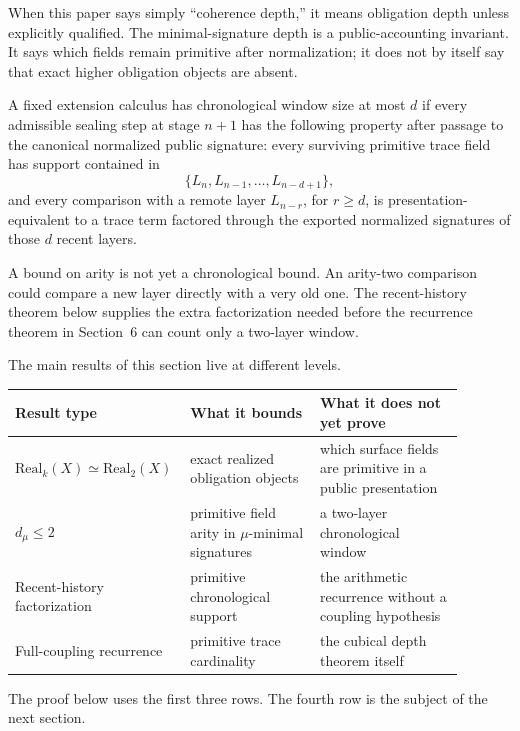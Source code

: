 When this paper says simply ``coherence depth,'' it means obligation depth unless explicitly
qualified.  The minimal-signature depth is a public-accounting invariant.  It says which
fields remain primitive after normalization; it does not by itself say that exact higher
obligation objects are absent.

\begin{definition}
\label{def:chronological-window}
A fixed extension calculus has chronological window size at most \(d\) if every admissible
sealing step at stage \(n+1\) has the following property after passage to the canonical
normalized public signature: every surviving primitive trace field has support contained in
\[
  \{L_n,L_{n-1},\ldots,L_{n-d+1}\},
\]
and every comparison with a remote layer \(L_{n-r}\), for \(r\geq d\), is
presentation-equivalent to a trace term factored through the exported normalized signatures of
those \(d\) recent layers.
\end{definition}

A bound on arity is not yet a chronological bound.  An arity-two comparison could compare a
new layer directly with a very old one.  The recent-history theorem below supplies the extra
factorization needed before the recurrence theorem in Section~6 can count only a two-layer
window.

\begin{remark}
\label{rem:level-audit}
The main results of this section live at different levels.
\begin{center}
\small
\begin{tabular}{p{0.29\linewidth}p{0.29\linewidth}p{0.31\linewidth}}
\hline
Result type & What it bounds & What it does not yet prove \\
\hline
\(\mathrm{Real}_k(X)\simeq \mathrm{Real}_2(X)\) & exact realized obligation objects &
which surface fields are primitive in a public presentation \\
\(d_\mu\leq 2\) & primitive field arity in \(\mu\)-minimal signatures & a two-layer
chronological window \\
Recent-history factorization & primitive chronological support & the arithmetic recurrence
without a coupling hypothesis \\
Full-coupling recurrence & primitive trace cardinality & the cubical depth theorem itself \\
\hline
\end{tabular}
\end{center}
The proof below uses the first three rows.  The fourth row is the subject of the next
section.
\end{remark}

